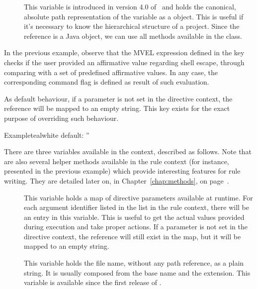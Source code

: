 \begin{description}
\begin{description}
\begin{description}
\item[] This variable is introduced in version 4.0 of \arara\ and holds the canonical, absolute path representation of the  variable as a  object. This is useful if it's necessary to know the hierarchical structure of a project. Since the reference is a Java object, we can use all methods available in the  class.
\end{description}

In the previous example, observe that the \gls{MVEL} expression defined in the  key checks if the user provided an affirmative value regarding shell escape, through comparing  with a set of predefined affirmative values. In any case, the corresponding command flag is defined as result of such evaluation.

\item[\describecontext{O}{arguments}{default}] As default behaviour, if a parameter is not set in the directive context, the reference will be mapped to an empty string. This key exists for the exact purpose of overriding such behaviour.

\begin{codebox}{Example}{teal}{\icnote}{white}
default: ''
\end{codebox}

There are three variables available in the  context, described as follows. Note that are also several helper methods available in the rule context (for instance,  presented in the previous example) which provide interesting features for rule writing. They are detailed later on, in Chapter~\ref{chap:methods}, on page~\pageref{chap:methods}.

\begin{description}
\item[] This variable holds a map of directive parameters available at runtime. For each argument identifier listed in the  list in the rule context, there will be an entry in this variable. This is useful to get the actual values provided during execution and take proper actions. If a parameter is not set in the directive context, the reference will still exist in the map, but it will be mapped to an empty string.

\item[] This variable holds the file name, without any path reference, as a plain string. It is usually composed from the base name and the extension. This variable is available since the first release of \arara.


\end{description}
\end{description}
\end{description}
